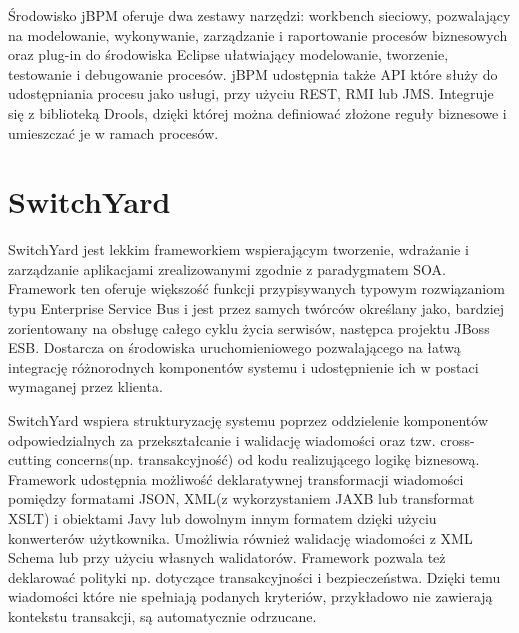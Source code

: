 Środowisko jBPM oferuje dwa zestawy narzędzi: workbench sieciowy, pozwalający na modelowanie, wykonywanie, zarządzanie i raportowanie procesów biznesowych oraz plug-in do środowiska Eclipse ułatwiający modelowanie, tworzenie, testowanie i debugowanie procesów.
jBPM udostępnia także API które służy do udostępniania procesu jako usługi, przy użyciu REST, RMI lub JMS. Integruje się z biblioteką Drools, dzięki której można definiować złożone reguły biznesowe i umieszczać je w ramach procesów.



\section{SwitchYard}
\label{sec:switchyard}

SwitchYard jest lekkim frameworkiem wspierającym tworzenie, wdrażanie i zarządzanie aplikacjami zrealizowanymi zgodnie z paradygmatem SOA. Framework ten oferuje większość funkcji przypisywanych typowym rozwiązaniom typu Enterprise Service Bus i jest przez samych twórców określany jako, bardziej zorientowany na obsługę całego cyklu życia serwisów, następca projektu JBoss ESB. Dostarcza on środowiska uruchomieniowego pozwalającego na łatwą integrację różnorodnych komponentów systemu i udostępnienie ich w postaci wymaganej przez klienta.

SwitchYard wspiera strukturyzację systemu poprzez oddzielenie komponentów odpowiedzialnych za  przekształcanie i walidację wiadomości oraz tzw. cross-cutting concerns(np. transakcyjność) od kodu realizującego logikę biznesową. Framework udostępnia możliwość deklaratywnej transformacji wiadomości pomiędzy formatami JSON, XML(z wykorzystaniem JAXB lub transformat XSLT) i obiektami Javy lub dowolnym innym formatem dzięki użyciu konwerterów użytkownika. Umożliwia również walidację wiadomości z XML Schema lub przy użyciu własnych walidatorów. Framework pozwala też deklarować polityki np. dotyczące transakcyjności i bezpieczeństwa. Dzięki temu wiadomości które nie spełniają podanych kryteriów, przykładowo nie zawierają kontekstu transakcji, są automatycznie odrzucane. 

